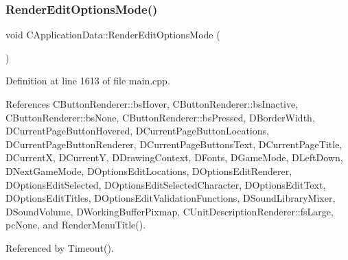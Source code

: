 \subsubsection{\texorpdfstring{Render\+Edit\+Options\+Mode()}{RenderEditOptionsMode()}}
{\footnotesize\ttfamily void C\+Application\+Data\+::\+Render\+Edit\+Options\+Mode (\begin{DoxyParamCaption}{ }\end{DoxyParamCaption})\hspace{0.3cm}{\ttfamily [protected]}}



Definition at line 1613 of file main.\+cpp.



References C\+Button\+Renderer\+::bs\+Hover, C\+Button\+Renderer\+::bs\+Inactive, C\+Button\+Renderer\+::bs\+None, C\+Button\+Renderer\+::bs\+Pressed, D\+Border\+Width, D\+Current\+Page\+Button\+Hovered, D\+Current\+Page\+Button\+Locations, D\+Current\+Page\+Button\+Renderer, D\+Current\+Page\+Buttons\+Text, D\+Current\+Page\+Title, D\+CurrentX, D\+CurrentY, D\+Drawing\+Context, D\+Fonts, D\+Game\+Mode, D\+Left\+Down, D\+Next\+Game\+Mode, D\+Options\+Edit\+Locations, D\+Options\+Edit\+Renderer, D\+Options\+Edit\+Selected, D\+Options\+Edit\+Selected\+Character, D\+Options\+Edit\+Text, D\+Options\+Edit\+Titles, D\+Options\+Edit\+Validation\+Functions, D\+Sound\+Library\+Mixer, D\+Sound\+Volume, D\+Working\+Buffer\+Pixmap, C\+Unit\+Description\+Renderer\+::fs\+Large, pc\+None, and Render\+Menu\+Title().



Referenced by Timeout().


